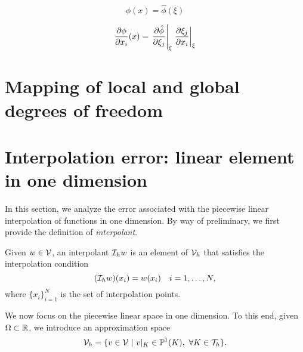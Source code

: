 \begin{equation*}
  \phi(x) = \hat \phi (\xi)
\end{equation*}

\begin{equation*}
  \frac{\partial \phi}{\partial x_i}(x) = \left. \frac{\partial \hat \phi}{\partial \xi_j} \right|_\xi  \left. \frac{\partial \xi_j}{\partial x_i} \right|_\xi
\end{equation*}

\section{Mapping of local and global degrees of freedom}
\label{sec:fe_map}



\section{Interpolation error: linear element in one dimension}
\label{sec:fe_interp_1d}
In this section, we analyze the error associated with the piecewise linear interpolation of functions in one dimension. By way of preliminary, we first provide the definition of \emph{interpolant}.
\begin{definition}[interpolant]
Given $w \in \mathcal{V}$, an interpolant $\mathcal{I}_h w$ is an element of $\mathcal{V}_h$ that satisfies the interpolation condition
\begin{equation*}
  (\mathcal{I}_h w)(x_i) = w(x_i) \quad i = 1,\dots, N,
\end{equation*}
where $\{x_i \}_{i=1}^N$ is the set of interpolation points.
\end{definition}

We now focus on the piecewise linear space in one dimension.  To this end, given $\Omega \subset \mathbb{R}$, we introduce an approximation space
\begin{equation*}
  \mathcal{V}_h = \{ v \in \mathcal{V} \ | \ v|_K \in \mathbb{P}^1(K), \ \forall K \in \mathcal{T}_h \}.
\end{equation*}

